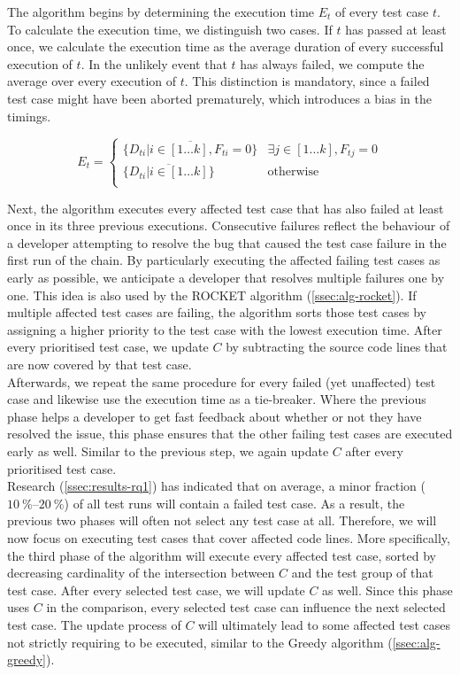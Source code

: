 \noindent The algorithm begins by determining the execution time $E_t$ of every test case $t$. To calculate the execution time, we distinguish two cases. If $t$ has passed at least once, we calculate the execution time as the average duration of every successful execution of $t$. In the unlikely event that $t$ has always failed, we compute the average over every execution of $t$. This distinction is mandatory, since a failed test case might have been aborted prematurely, which introduces a bias in the timings.

\[
	E_t = \left.
	\begin{cases}
		\overline{\{D_{ti} \vert i \in [1 \dots k], F_{ti} = 0\}} & \exists j \in [1 \dots k], F_{tj} = 0 \\
		\overline{\{D_{ti} \vert i \in [1 \dots k]\}} & \text{otherwise} \\
	\end{cases}
	\right.
\]

\noindent Next, the algorithm executes every affected test case that has also failed at least once in its three previous executions. Consecutive failures reflect the behaviour of a developer attempting to resolve the bug that caused the test case failure in the first run of the chain. By particularly executing the affected failing test cases as early as possible, we anticipate a developer that resolves multiple failures one by one. This idea is also used by the ROCKET algorithm (\cref{ssec:alg-rocket}). If multiple affected test cases are failing, the algorithm sorts those test cases by assigning a higher priority to the test case with the lowest execution time. After every prioritised test case, we update $C$ by subtracting the source code lines that are now covered by that test case.\\

\noindent Afterwards, we repeat the same procedure for every failed (yet unaffected) test case and likewise use the execution time as a tie-breaker. Where the previous phase helps a developer to get fast feedback about whether or not they have resolved the issue, this phase ensures that the other failing test cases are executed early as well. Similar to the previous step, we again update $C$ after every prioritised test case.\\

\noindent Research (\cref{ssec:results-rq1}) has indicated that on average, a minor fraction ($\SIrange{10}{20}{\percent}$) of all test runs will contain a failed test case. As a result, the previous two phases will often not select any test case at all. Therefore, we will now focus on executing test cases that cover affected code lines. More specifically, the third phase of the algorithm will execute every affected test case, sorted by decreasing cardinality of the intersection between $C$ and the test group of that test case. After every selected test case, we will update $C$ as well. Since this phase uses $C$ in the comparison, every selected test case can influence the next selected test case. The update process of $C$ will ultimately lead to some affected test cases not strictly requiring to be executed, similar to the Greedy algorithm (\cref{ssec:alg-greedy}).\\

